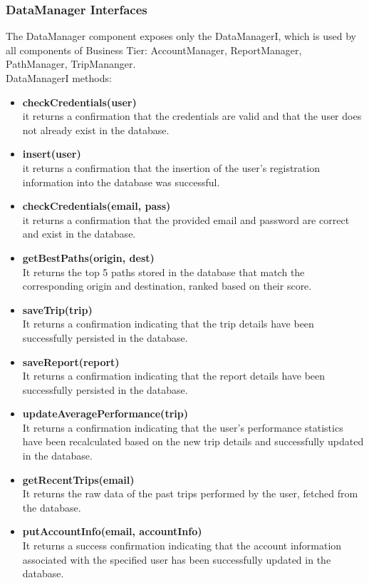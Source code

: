 \subsubsection{DataManager Interfaces}
The DataManager component exposes only the DataManagerI, which is used by all components of Business Tier: AccountManager, ReportManager, PathManager, TripMananger.\\
DataManagerI methods:
\begin{itemize}
    \item \textbf{checkCredentials(user)}\\
    it returns a confirmation that the credentials are valid and that the user does not already exist in the database.
    \item \textbf{insert(user)}\\
    it returns a confirmation that the insertion of the user's registration information into the database was successful.
    \item \textbf{checkCredentials(email, pass)}\\
    it returns a confirmation that the provided email and password are correct and exist in the database.
    \item \textbf{getBestPaths(origin, dest)}\\
    It returns the top 5 paths stored in the database that match the corresponding origin and destination, ranked based on their score.
    \item \textbf{saveTrip(trip)}\\
    It returns a confirmation indicating that the trip details have been successfully persisted in the database.
    \item \textbf{saveReport(report)}\\
    It returns a confirmation indicating that the report details have been successfully persisted in the database.
    \item \textbf{updateAveragePerformance(trip)}\\
    It returns a confirmation indicating that the user's performance statistics have been recalculated based on the new trip details and successfully updated in the database.
    \item \textbf{getRecentTrips(email)}\\
    It returns the raw data of the past trips performed by the user, fetched from the database.
    \item \textbf{putAccountInfo(email, accountInfo)}\\
    It returns a success confirmation indicating that the account information associated with the specified user has been successfully updated in the database.

\end{itemize}
